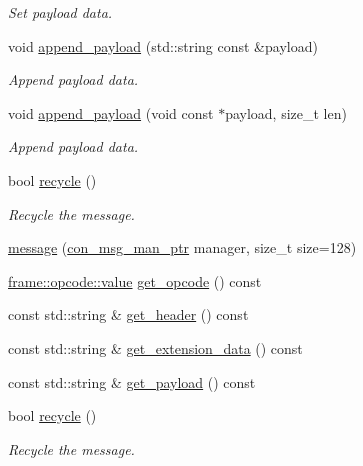 \begin{DoxyCompactItemize}
\begin{DoxyCompactList}\small\item\em Set payload data. \end{DoxyCompactList}\item 
void \hyperlink{classwebsocketpp_1_1message__buffer_1_1message_addb7f631d522de382d5dd668a1b66020}{append\+\_\+payload} (std\+::string const \&payload)
\begin{DoxyCompactList}\small\item\em Append payload data. \end{DoxyCompactList}\item 
void \hyperlink{classwebsocketpp_1_1message__buffer_1_1message_a85cbf746725a6e34fef2b51604a29c71}{append\+\_\+payload} (void const $\ast$payload, size\+\_\+t len)
\begin{DoxyCompactList}\small\item\em Append payload data. \end{DoxyCompactList}\item 
bool \hyperlink{classwebsocketpp_1_1message__buffer_1_1message_a2c19e247389598d9f81c9447ddcfba51}{recycle} ()
\begin{DoxyCompactList}\small\item\em Recycle the message. \end{DoxyCompactList}\item 
\hyperlink{classwebsocketpp_1_1message__buffer_1_1message_ae5708790af579115f87466d958160d9e}{message} (\hyperlink{classwebsocketpp_1_1message__buffer_1_1message_abb7a33ceab94975c7503102537c33b48}{con\+\_\+msg\+\_\+man\+\_\+ptr} manager, size\+\_\+t size=128)
\item 
\hyperlink{namespacewebsocketpp_1_1frame_1_1opcode_ae68711643096dfc4af6d66ade3f9fd5e}{frame\+::opcode\+::value} \hyperlink{classwebsocketpp_1_1message__buffer_1_1message_a26ea226b8e4d6155095f5bb40752a583}{get\+\_\+opcode} () const 
\item 
const std\+::string \& \hyperlink{classwebsocketpp_1_1message__buffer_1_1message_a9eadbd09f12d2559c8b4021c5a13eb12}{get\+\_\+header} () const 
\item 
const std\+::string \& \hyperlink{classwebsocketpp_1_1message__buffer_1_1message_a53a4133813dbefbeec62e8f61374bdb7}{get\+\_\+extension\+\_\+data} () const 
\item 
const std\+::string \& \hyperlink{classwebsocketpp_1_1message__buffer_1_1message_a5b09ad846ad17d26adbc3bd69a2a95c0}{get\+\_\+payload} () const 
\item 
bool \hyperlink{classwebsocketpp_1_1message__buffer_1_1message_a2c19e247389598d9f81c9447ddcfba51}{recycle} ()
\begin{DoxyCompactList}\small\item\em Recycle the message. \end{DoxyCompactList}\end{DoxyCompactItemize}


